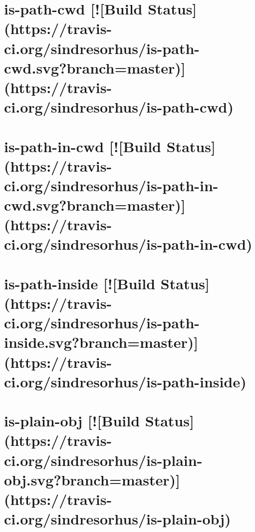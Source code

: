 \documentclass[twoside]{book}
\newcommand{\+}{\discretionary{\mbox{\scriptsize$\hookleftarrow$}}{}{}}
\begin{document}
\chapter{is-\/path-\/cwd \mbox{[}!\mbox{[}Build Status\mbox{]}(https\+://travis-\/ci.org/sindresorhus/is-\/path-\/cwd.svg?branch=master)\mbox{]}(https\+://travis-\/ci.org/sindresorhus/is-\/path-\/cwd)}
\label{md__c_1_workspace_demo_src_main_script_node_modules_is-path-cwd_readme}

\chapter{is-\/path-\/in-\/cwd \mbox{[}!\mbox{[}Build Status\mbox{]}(https\+://travis-\/ci.org/sindresorhus/is-\/path-\/in-\/cwd.svg?branch=master)\mbox{]}(https\+://travis-\/ci.org/sindresorhus/is-\/path-\/in-\/cwd)}
\label{md__c_1_workspace_demo_src_main_script_node_modules_is-path-in-cwd_readme}

\chapter{is-\/path-\/inside \mbox{[}!\mbox{[}Build Status\mbox{]}(https\+://travis-\/ci.org/sindresorhus/is-\/path-\/inside.svg?branch=master)\mbox{]}(https\+://travis-\/ci.org/sindresorhus/is-\/path-\/inside)}
\label{md__c_1_workspace_demo_src_main_script_node_modules_is-path-inside_readme}

\chapter{is-\/plain-\/obj \mbox{[}!\mbox{[}Build Status\mbox{]}(https\+://travis-\/ci.org/sindresorhus/is-\/plain-\/obj.svg?branch=master)\mbox{]}(https\+://travis-\/ci.org/sindresorhus/is-\/plain-\/obj)}
\label{md__c_1_workspace_demo_src_main_script_node_modules_is-plain-obj_readme}

\end{document}
